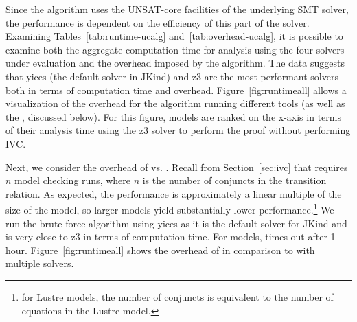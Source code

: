 Since the \ucalg algorithm uses the UNSAT-core facilities of the underlying SMT solver, the performance is dependent on the efficiency of this part of the solver.  Examining Tables~\ref{tab:runtime-ucalg} and~\ref{tab:overhead-ucalg}, it is possible to examine both the aggregate computation time for analysis using the four solvers under evaluation and the overhead imposed by the \ucalg algorithm.  The data suggests that yices (the default solver in JKind) and z3 are the most performant solvers both in terms of computation time and overhead.  Figure~\ref{fig:runtimeall} allows a visualization of the overhead for the \ucalg algorithm running different tools (as well as the \bfalg, discussed below).  For this figure, models are ranked on the x-axis in terms of their analysis time using the z3 solver to perform the proof without performing IVC.






Next, we consider the overhead of \ucalg vs. \bfalg.  Recall from Section~\ref{sec:ivc} that \bfalg requires $n$ model checking runs, where $n$ is the number of conjuncts in the transition relation. As expected, the performance is approximately a linear multiple of the size of the model, so larger models yield substantially lower performance.\footnote{for Lustre models, the number of conjuncts is equivalent to the number of equations in the Lustre model.}  We run the brute-force algorithm using yices as it is the default solver for JKind and is very close to z3 in terms of computation time.  For  models, \bfalg times out after 1 hour.   Figure~\ref{fig:runtimeall} shows the overhead of \bfalg in comparison to \ucalg with multiple solvers.

